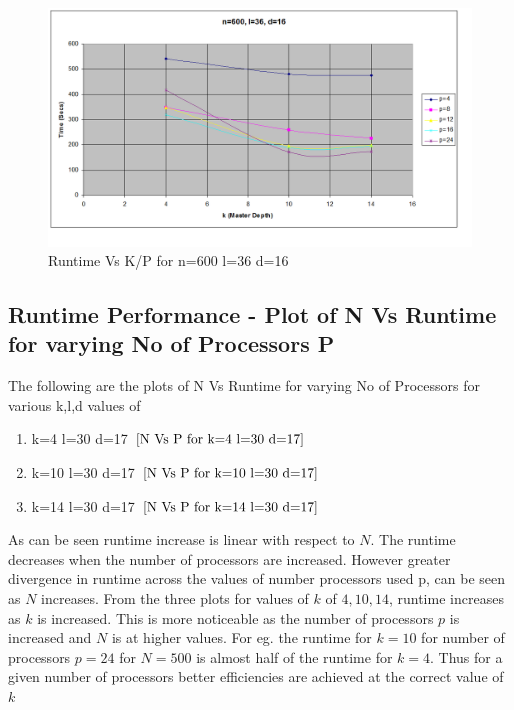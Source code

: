 \documentclass[twoside,11pt]{article}\usepackage{amsmath,amsfonts,amsthm,fullpage}
\begin{document}
\begin{figure}[!htbp]
\centering
\includegraphics[scale=.46]{images/nld_n=600-l=36-d=16} 
\caption{Runtime Vs K/P for n=600 l=36 d=16}
\label{K Vs P for n=600 l=36 d=16}
\end{figure}





\pagebreak
\subsection{Runtime Performance - Plot of N Vs Runtime for varying No of Processors P}

The following are the plots of N Vs Runtime for varying No of Processors for various k,l,d values of 
\begin{enumerate}
\item
k=4 l=30 d=17 $\eqref{N Vs P for k=4 l=30 d=17}$
\item
k=10 l=30 d=17 $\eqref{N Vs P for k=10 l=30 d=17}$
\item
k=14 l=30 d=17 $\eqref{N Vs P for k=14 l=30 d=17}$
\end{enumerate}
As can be seen runtime increase is linear with respect to $N$. The runtime decreases when the number of processors are increased. However greater divergence in runtime across the values of number processors used p, can be seen as $N$ increases. From the three plots for values of $k$ of $4,10,14$, runtime increases as $k$ is increased. This is more noticeable as the number of processors $p$ is increased and $N$ is at higher values. For eg. the runtime for $k=10$ for number of processors $p=24$ for $N=500$ is almost half of the runtime for $k=4$. Thus for a given number of processors better efficiencies are achieved at the correct value of $k$ 
\end{document}
